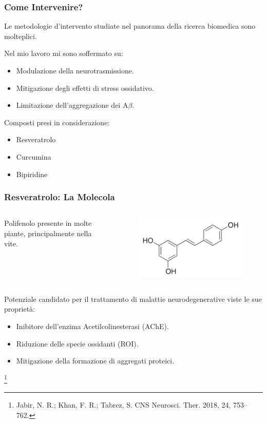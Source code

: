 \documentclass[9pt]{beamer}
\newcommand\blfootnote[1]{%
	\begingroup
	\renewcommand\thefootnote{}\footnote{#1}%
	\addtocounter{footnote}{-1}%
	\endgroup
}
\begin{document}
\begin{frame}
	\frametitle{Come Intervenire?}
	Le metodologie d'intervento studiate nel panorama della ricerca biomedica sono molteplici.
	
	Nel mio lavoro mi sono soffermato su:
	\begin{itemize}
		\item Modulazione della neurotrasmissione.
		\item Mitigazione degli effetti di stress ossidativo.
		\item Limitazione dell'aggregazione dei A$\beta$.
	\end{itemize}
	
	Composti presi in considerazione:
	\begin{itemize}
		\item Resveratrolo %
		\item Curcumina
		\item Bipiridine
	\end{itemize}
	
	
\end{frame}


\begin{frame}
	\frametitle{Resveratrolo: La Molecola}
	\begin{columns}
		\begin{column}{0.5\textwidth}
			Polifenolo presente in molte piante, principalmente nella vite.
		\end{column}
		\begin{column}{0.5\textwidth}
			\begin{figure}
				\includegraphics[width=.8\textwidth]{immagini/resveratrolo.png}
			\end{figure}
		\end{column}
	\end{columns}
	\medskip
	
	
	Potenziale candidato per il trattamento di malattie neurodegenerative viste le sue proprietà:
	\begin{itemize}
		\item Inibitore dell'enzima Acetilcolinesterasi (AChE).
		\item Riduzione delle specie ossidanti (ROI).
		\item Mitigazione della formazione di aggregati proteici.
	\end{itemize}
	\blfootnote{Jabir, N. R.; Khan, F. R.; Tabrez, S. CNS Neurosci. Ther. 2018, 24, 753–762.}
\end{frame}
\end{document}
